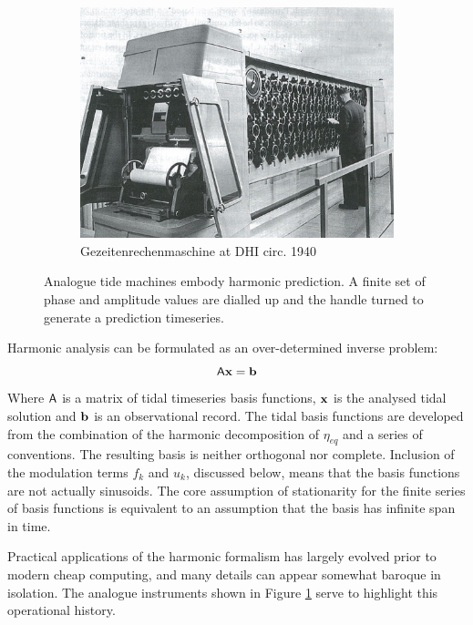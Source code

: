 \begin{figure}[H]
\begin{subfigure}[t]{\figwidthHalf}
    	\includegraphics[width=\textwidth]{figures/images/DHI_machine_cartwright_fig11p2.png}
	    \caption{Gezeitenrechenmaschine at DHI circ. 1940 }
	\end{subfigure}
	\caption{Analogue tide machines embody harmonic prediction.  A finite set of phase and amplitude values are dialled up and the handle turned to generate a prediction timeseries.}
	\label{fig:tide_machines}
\end{figure}
Harmonic analysis can be formulated as an over-determined inverse problem:
\begin{equation}
    \label{E:Axb}   
    \mathsf{A} \mathbf{x}=\mathbf{b} 
\end{equation}
Where $\mathsf{A}$ is a matrix of tidal timeseries basis functions, $\mathbf{x}$ is the analysed tidal solution and $\mathbf{b}$ is an observational record. The tidal basis functions are developed from the combination of the harmonic decomposition of $\eta_{eq}$ and a series of conventions.  The resulting basis is neither orthogonal nor complete. Inclusion of the modulation terms $f_k$ and $u_k$, discussed below, means that the basis functions are not actually sinusoids. The core assumption of stationarity for the finite series of basis functions is equivalent to an assumption that the basis has infinite span in time.   

Practical applications of the harmonic formalism has largely evolved prior to modern cheap computing, and many details can appear somewhat baroque in isolation.  The analogue instruments shown in Figure \ref{fig:tide_machines} serve to highlight this operational history.


